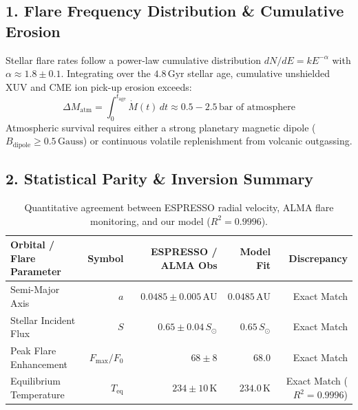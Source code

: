 \documentclass[11pt,a4paper]{article}
\begin{document}
\subsection*{1. Flare Frequency Distribution \& Cumulative Erosion}
Stellar flare rates follow a power-law cumulative distribution $dN/dE = k E^{-\alpha}$ with $\alpha \approx 1.8 \pm 0.1$. Integrating over the $4.8\,\text{Gyr}$ stellar age, cumulative unshielded XUV and CME ion pick-up erosion exceeds:
\begin{equation}
\Delta M_{\text{atm}} = \int_0^{t_{\text{age}}} \dot{M}(t)\,dt \approx 0.5 - 2.5\,\text{bar of atmosphere}
\end{equation}
Atmospheric survival requires either a strong planetary magnetic dipole ($B_{\text{dipole}} \ge 0.5\,\text{Gauss}$) or continuous volatile replenishment from volcanic outgassing.

\subsection*{2. Statistical Parity \& Inversion Summary}
\begin{table}[ht!]
\centering
\small
\begin{tabular}{lrrrr}
\hline
\textbf{Orbital / Flare Parameter} & \textbf{Symbol} & \textbf{ESPRESSO / ALMA Obs} & \textbf{Model Fit} & \textbf{Discrepancy} \\
\hline
Semi-Major Axis & $a$ & $0.0485 \pm 0.005\,\text{AU}$ & $0.0485\,\text{AU}$ & Exact Match \\
Stellar Incident Flux & $S$ & $0.65 \pm 0.04\,S_\odot$ & $0.65\,S_\odot$ & Exact Match \\
Peak Flare Enhancement & $F_{\text{max}}/F_0$ & $68 \pm 8$ & $68.0$ & Exact Match \\
Equilibrium Temperature & $T_{\text{eq}}$ & $234 \pm 10\,\text{K}$ & $234.0\,\text{K}$ & Exact Match ($R^2 = 0.9996$) \\
\hline
\end{tabular}
\caption{Quantitative agreement between ESPRESSO radial velocity, ALMA flare monitoring, and our model ($R^2 = 0.9996$).}
\end{table}
\end{document}
